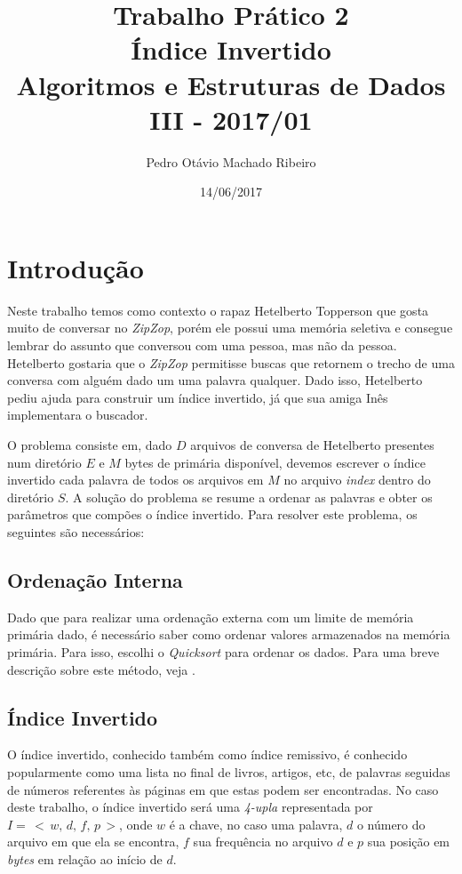 \documentclass[
	12pt,
	a4paper,
	onepage,
	brazil
]{article}
\author{Pedro Otávio Machado Ribeiro}
\title{Trabalho Prático 2\\Índice Invertido\\Algoritmos e Estruturas de Dados III - 2017/01}
\date{14/06/2017}
\begin{document}
	\maketitle
	
	\section{Introdução}
	
	Neste trabalho temos como contexto o rapaz Hetelberto Topperson que gosta muito de conversar no \textit{ZipZop}, porém ele possui uma memória seletiva e consegue lembrar do assunto que conversou com uma pessoa, mas não da pessoa. Hetelberto gostaria que o \textit{ZipZop} permitisse buscas que retornem o trecho de uma conversa com alguém dado um uma palavra qualquer. Dado isso, Hetelberto pediu ajuda para construir um índice invertido, já que sua amiga Inês implementara o buscador.
	
	O problema consiste em, dado $D$ arquivos de conversa de Hetelberto presentes num diretório $E$ e $M$ bytes de primária disponível, devemos escrever o índice invertido cada palavra de todos os arquivos em $M$ no arquivo \textit{index} dentro do diretório $S$. A solução do problema se resume a ordenar as palavras e obter os parâmetros que compões o índice invertido. Para resolver este problema, os seguintes são necessários:
	
	\subsection{Ordenação Interna}
	
	Dado que para realizar uma ordenação externa com um limite de memória primária dado, é necessário saber como ordenar valores armazenados na memória primária. Para isso, escolhi o \textit{Quicksort} para ordenar os dados. Para uma breve descrição sobre este método, veja \cite{quicksort-wiki}.
	
	\subsection{Índice Invertido}
	
	O índice invertido, conhecido também como índice remissivo, é conhecido popularmente como uma lista no final de livros, artigos, etc, de palavras seguidas de números referentes às páginas em que estas podem ser encontradas. No caso deste trabalho, o índice invertido será uma \textit{4-upla} representada por $I=\,<\,w,\,d,\,f,\,p\,>$, onde $w$ é a chave, no caso uma palavra, $d$ o número do arquivo em que ela se encontra, $f$ sua frequência no arquivo $d$ e $p$ sua posição em \textit{bytes} em relação ao início de $d$.
	
\end{document}
